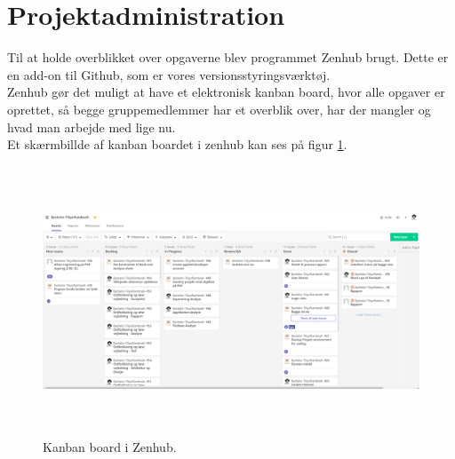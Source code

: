 \section{Projektadministration}
Til at holde overblikket over opgaverne blev programmet Zenhub brugt. Dette er en add-on til Github, som er vores versionsstyringsværktøj. \\
Zenhub gør det muligt at have et elektronisk kanban board, hvor alle opgaver er oprettet, så begge gruppemedlemmer har et overblik over, har der mangler og hvad man arbejde med lige nu. \\
Et skærmbillde af kanban boardet i zenhub kan ses på figur \ref{fig:ZenhubScrum}.

\begin{figure} [H]
	\begin{center}
		\includegraphics[height=8cm, width=15cm]{Projektadministration/Zenhub}
	\end{center}
	\caption{Kanban board i Zenhub.}
	\label{fig:ZenhubScrum}
\end{figure} 
